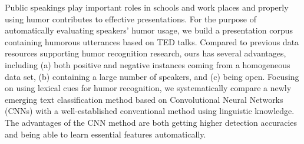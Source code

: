 Public speakings play important roles in schools and work places and properly using humor contributes to effective presentations. For the purpose of automatically evaluating speakers' humor usage, we build a presentation corpus containing humorous utterances based on TED talks. Compared to previous data resources supporting humor recognition research, ours has several advantages, including (a) both positive and negative instances coming from a homogeneous data set, (b) containing a large number of speakers, and (c) being open. Focusing on using lexical cues for humor recognition, we systematically compare a newly emerging text classification method based on Convolutional Neural Networks (CNNs) with a well-established conventional method using linguistic knowledge. The advantages of the CNN method are both getting higher detection accuracies and being able to learn essential features automatically.
